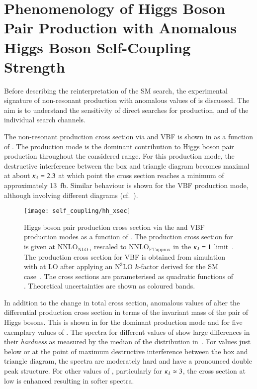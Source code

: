 \section{Phenomenology of Higgs Boson Pair Production with Anomalous
  Higgs Boson Self-Coupling Strength}%
\label{sec:self_coupling_pheno}

Before describing the reinterpretation of the SM \HH search, the
experimental signature of non-resonant \HH production with anomalous
values of \klambda is discussed. The aim is to understand the
sensitivity of direct searches for \HH production, and of the
individual search channels.

The non-resonant \HH production cross section via \ggF and VBF is
shown in  as a function of \klambda. The \ggF
production mode is the dominant contribution to Higgs boson pair
production throughout the considered \klambda range. For this
production mode, the destructive interference between the box and
triangle diagram becomes maximal at about $\kappa_{\lambda} = 2.3$ at which
point the cross section reaches a minimum of approximately
\SI{13}{\femto\barn}. Similar behaviour is shown for the VBF
production mode, although involving different diagrams (cf.\
).

\begin{figure}[htbp]
  \centering

  \texttt{[image: self\_coupling/hh\_xsec]}

  \caption{Higgs boson pair production cross section via the \ggF and
    VBF production modes as a function of \klambda. The production
    cross section for \ggF is given at $\text{NNLO}_{\text{NLO-i}}$
    rescaled to $\text{NNLO}_{\text{FTapprox}}$ in the $\kappa_{\lambda} = 1$
    limit~\cite{Amoroso:2020lgh,Baglio:2020wgt,LHCHWGHH,Grazzini:2018bsd}. The
    production cross section for VBF is obtained from simulation with
    \MGNLO at LO after applying an $\text{N}^3\text{LO}$ $k$-factor
    derived for the SM case~\cite{Dreyer:2018qbw,LHCHWGHH}. The cross
    sections are parameterised as quadratic functions of
    \klambda. Theoretical uncertainties are shown as coloured bands.}%
  \label{fig:hh_xsec_incl}
\end{figure}

In addition to the change in total cross section, anomalous values of
\klambda alter the differential \HH production cross section in terms
of the invariant mass of the pair of Higgs bosons. This is shown in
\Cref{fig:hh_xsec_mhh} for the dominant \ggF production mode and for
five exemplary values of \klambda. The \mHH spectra for different
values of \klambda show large differences in their \emph{hardness} as
measured by the median of the \mHH distribution
in~. For \klambda values just below or at the
point of maximum destructive interference between the box and triangle
diagram, the \mHH spectra are moderately hard and have a pronounced
double peak structure. For other values of \klambda, particularly for
$\kappa_{\lambda} \approx 3$, the cross section at low \mHH is enhanced
resulting in softer \mHH spectra.

